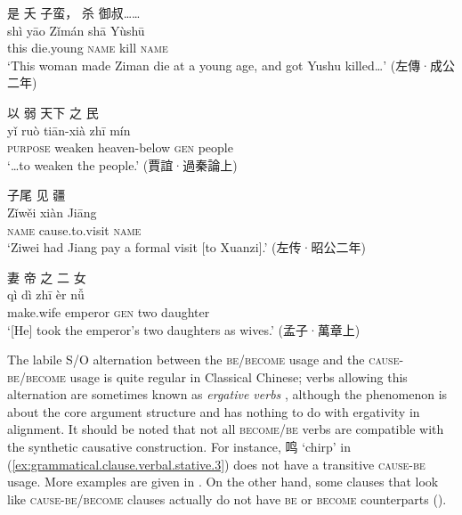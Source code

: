 \documentclass[UTF8, a4paper, oneside, scheme=plain, 12pt]{ctexrep}
\newcommand*{\citepage}[1]{p.~{#1}}
\newcommand*{\term}[1]{\emph{#1}}
\newcommand{\translate}[1]{`#1'}
\newcommand*{\category}[1]{\textsc{#1}}
\begin{document}
\begin{exe}
    \ex\label{ex:grammatical.clause.verbal.argument.causative.synthetic.1}
    \glll 是 夭 子蛮， 杀 御叔…… \\
    shì yāo Zǐmán shā Yùshū \\
    this die.young \category{name} kill \category{name} \\
    \glt\translate{This woman made Ziman die at a young age, and got Yushu killed\dots} \hfill (左傳·成公二年)
    
    \ex\label{ex:grammatical.clause.verbal.argument.causative.synthetic.2}
    \glll 以 弱 天下 之 民 \\
    yǐ ruò tiān-xià zhī mín \\
    \category{purpose} weaken heaven-below \category{gen} people \\
    \glt\translate{\dots to weaken the people.} \hfill (賈誼·過秦論上)

    \ex\label{ex:grammatical.clause.verbal.argument.causative.synthetic.3}
    \glll 子尾 见 疆 \\
    Zǐwěi xiàn Jiāng \\
    \category{name} cause.to.visit \category{name} \\
    \glt\translate{Ziwei had Jiang pay a formal visit [to Xuanzi].} (左传·昭公二年)

    \ex\label{ex:grammatical.clause.verbal.argument.causative.synthetic.4}
    \glll 妻 帝 之 二 女 \\
    qì dì zhī èr nǚ \\
    make.wife emperor \category{gen} two daughter \\
    \glt\translate{[He] took the emperor's two daughters as wives.} \hfill (孟子·萬章上)
\end{exe}

The labile S/O alternation between the \category{be}/\category{become} usage
and the \category{cause}-\category{be}/\category{become} usage
is quite regular in Classical Chinese;
verbs allowing this alternation are sometimes known as \term{ergative verbs}
\citep[\citepage{378}]{meiguang2018},
although the phenomenon is about the core argument structure and has nothing to do with ergativity in alignment.
It should be noted that not all \category{become}/\category{be} verbs are compatible
with the synthetic causative construction.
For instance, 鸣 \translate{chirp} in (\ref{ex:grammatical.clause.verbal.stative.3})
does not have a transitive \category{cause}-\category{be} usage.
More examples are given in \citet[\citepage{276}]{meiguang2018}.
On the other hand, some clauses that look like \category{cause}-\category{be}/\category{become} clauses
actually do not have \category{be} or \category{become} counterparts 
().
\end{document}
